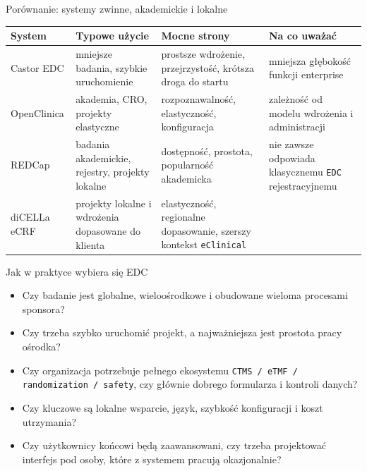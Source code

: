 \begin{frame}{Porównanie: systemy zwinne, akademickie i lokalne}
  \scriptsize
  \begin{tabular}{p{2.0cm} p{2.6cm} p{2.8cm} p{2.8cm}}
    \textbf{System} & \textbf{Typowe użycie} & \textbf{Mocne strony} & \textbf{Na co uważać} \\
    \hline
    Castor EDC & mniejsze badania, szybkie uruchomienie & prostsze wdrożenie, przejrzystość, krótsza droga do startu & mniejsza głębokość funkcji enterprise \\
    \hline
    OpenClinica & akademia, CRO, projekty elastyczne & rozpoznawalność, elastyczność, konfiguracja & zależność od modelu wdrożenia i administracji \\
    \hline
    REDCap & badania akademickie, rejestry, projekty lokalne & dostępność, prostota, popularność akademicka & nie zawsze odpowiada klasycznemu \texttt{EDC} rejestracyjnemu \\
    \hline
    diCELLa eCRF & projekty lokalne i wdrożenia dopasowane do klienta & elastyczność, regionalne dopasowanie, szerszy kontekst \texttt{eClinical} & \\
  \end{tabular}
\end{frame}

\begin{frame}{Jak w praktyce wybiera się EDC}
  \begin{itemize}
    \item Czy badanie jest globalne, wieloośrodkowe i obudowane wieloma procesami sponsora?
    \item Czy trzeba szybko uruchomić projekt, a najważniejsza jest prostota pracy ośrodka?
    \item Czy organizacja potrzebuje pełnego ekosystemu \texttt{CTMS / eTMF / randomization / safety}, czy głównie dobrego formularza i kontroli danych?
    \item Czy kluczowe są lokalne wsparcie, język, szybkość konfiguracji i koszt utrzymania?
    \item Czy użytkownicy końcowi będą zaawansowani, czy trzeba projektować interfejs pod osoby, które z systemem pracują okazjonalnie?
  \end{itemize}
\end{frame}

